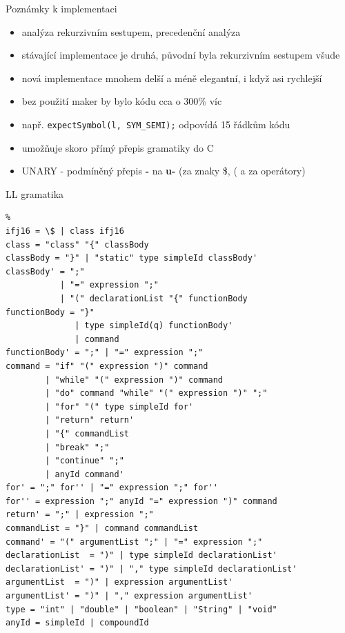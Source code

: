 \documentclass[13pt]{beamer}
\begin{document}
\begin{frame}{Poznámky k implementaci}
\begin{itemize}
\item analýza rekurzivním sestupem, precedenční analýza
\item stávající implementace je druhá, původní byla rekurzivním sestupem všude
\item nová implementace mnohem delší a méně elegantní, i když asi rychlejší
\item bez použití maker by bylo kódu cca o 300\% víc
\item např. \texttt{expectSymbol(l, SYM\_SEMI);} odpovídá 15 řádkům kódu
\item umožňuje skoro přímý přepis gramatiky do C
\item UNARY - podmíněný přepis \textbf{-} na \textbf{u-} (za znaky \$, ( a za operátory)
\end{itemize}
\end{frame}

\begin{frame}[fragile]{LL gramatika}
\begin{lrbox}{\grammarbox}%
    \begin{lstlisting}%
ifj16 = \$ | class ifj16
class = "class" "{" classBody
classBody = "}" | "static" type simpleId classBody'
classBody' = ";"
           | "=" expression ";"
           | "(" declarationList "{" functionBody
functionBody = "}"
              | type simpleId(q) functionBody'
              | command
functionBody' = ";" | "=" expression ";"
command = "if" "(" expression ")" command
        | "while" "(" expression ")" command
        | "do" command "while" "(" expression ")" ";"
        | "for" "(" type simpleId for'
        | "return" return'
        | "{" commandList
        | "break" ";"
        | "continue" ";"
        | anyId command'
for' = ";" for'' | "=" expression ";" for''
for'' = expression ";" anyId "=" expression ")" command
return' = ";" | expression ";"
commandList = "}" | command commandList
command' = "(" argumentList ";" | "=" expression ";"
declarationList  = ")" | type simpleId declarationList'
declarationList' = ")" | "," type simpleId declarationList'
argumentList  = ")" | expression argumentList'
argumentList' = ")" | "," expression argumentList'
type = "int" | "double" | "boolean" | "String" | "void"
anyId = simpleId | compoundId
    \end{lstlisting}%
\end{lrbox}%
\scalebox{0.52}{\usebox{\grammarbox}}
\end{frame}
\end{document}
